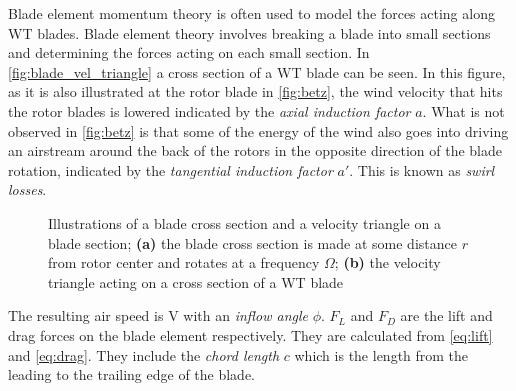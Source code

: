 Blade element momentum theory is often used to model the forces acting along WT blades. Blade element theory involves breaking a blade into small sections and determining the forces acting on each small section. In \cref{fig:blade_vel_triangle} a cross section of a WT blade can be seen. In this figure, as it is also illustrated at the rotor blade in \cref{fig:betz}, the wind velocity that hits the rotor blades is lowered indicated by the \textit{axial induction factor} $ a $. What is not observed in \cref{fig:betz} is that some of the energy of the wind also goes into driving an airstream around the back of the rotors in the opposite direction of the blade rotation, indicated by the \textit{tangential induction factor} $ a' $. This is known as \textit{swirl losses}.
\begin{figure}[ht]
	\centering
	\hfil
	\caption{Illustrations of a blade cross section and a velocity triangle on a blade section; \textbf{(a)} the blade cross section is made at some distance $ r $ from rotor center and rotates at a frequency $ \Omega $; \textbf{(b)} the velocity triangle acting on a cross section of a WT blade}
	\label{fig:blade_triangles}
\end{figure}
The resulting air speed is V with an \textit{inflow angle} $ \phi $. $ F_L $ and $ F_D $ are the lift and drag forces on the blade element respectively. They are calculated from \cref{eq:lift} and \cref{eq:drag}. They include the \textit{chord length} $ c $ which is the length from the leading to the trailing edge of the blade.
